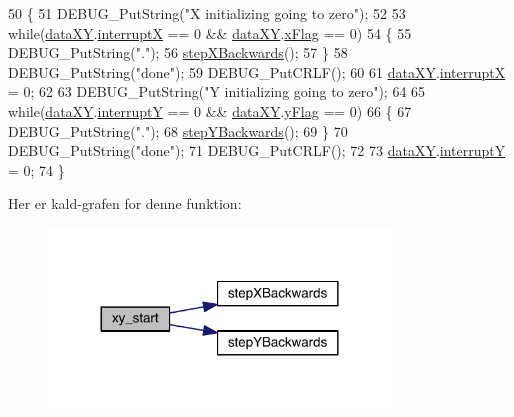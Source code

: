 \begin{DoxyCode}
50 \{
51   DEBUG\_PutString(\textcolor{stringliteral}{"X initializing going to zero"});
52   
53   \textcolor{keywordflow}{while}(\hyperlink{data_8h_a89d7998a721b3f36f9f4131e7a5e42d2}{dataXY}.\hyperlink{data_8h_a4cacb2964bb4b589bf79aa64a398725b}{interruptX} == 0 && \hyperlink{data_8h_a89d7998a721b3f36f9f4131e7a5e42d2}{dataXY}.\hyperlink{data_8h_abd60bb18cb69d4a782e0334caad9ffbc}{xFlag} == 0)
54   \{
55     DEBUG\_PutString(\textcolor{stringliteral}{"."});
56     \hyperlink{class_x_y_a30e07320705aa878e1f5a1b959eba099}{stepXBackwards}();
57   \}
58   DEBUG\_PutString(\textcolor{stringliteral}{"done"});
59   DEBUG\_PutCRLF();
60   
61   \hyperlink{data_8h_a89d7998a721b3f36f9f4131e7a5e42d2}{dataXY}.\hyperlink{data_8h_a4cacb2964bb4b589bf79aa64a398725b}{interruptX} = 0;
62   
63   DEBUG\_PutString(\textcolor{stringliteral}{"Y initializing going to zero"});
64   
65   \textcolor{keywordflow}{while}(\hyperlink{data_8h_a89d7998a721b3f36f9f4131e7a5e42d2}{dataXY}.\hyperlink{data_8h_a0149ea97a32442280eb1c0b30c1eeaf1}{interruptY} == 0 && \hyperlink{data_8h_a89d7998a721b3f36f9f4131e7a5e42d2}{dataXY}.\hyperlink{data_8h_a2093b99c34cd9ec2a282b9c4c3f61935}{yFlag} == 0)
66   \{
67     DEBUG\_PutString(\textcolor{stringliteral}{"."});
68     \hyperlink{class_x_y_aea96dacda1955992c5436dcb829daa26}{stepYBackwards}();
69   \}
70   DEBUG\_PutString(\textcolor{stringliteral}{"done"});
71   DEBUG\_PutCRLF();
72   
73   \hyperlink{data_8h_a89d7998a721b3f36f9f4131e7a5e42d2}{dataXY}.\hyperlink{data_8h_a0149ea97a32442280eb1c0b30c1eeaf1}{interruptY} = 0;
74 \}
\end{DoxyCode}


Her er kald-\/grafen for denne funktion\+:\nopagebreak
\begin{figure}[H]
\begin{center}
\leavevmode
\includegraphics[width=257pt]{db/d87/class_x_y_a47c6cc7fae92395e4d1231428c7070d4_cgraph}
\end{center}
\end{figure}





